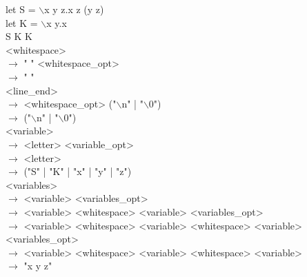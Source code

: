 \documentclass[12pt]{article}
\begin{document}
let S = $\backslash$x y z.x z (y z) \\
let K = $\backslash$x y.x \\
S K K \\

<whitespace> \\
$\rightarrow$ " " <whitespace\_opt> \\
$\rightarrow$ " " \\

<line\_end> \\
$\rightarrow$ <whitespace\_opt> ("$\backslash$n" | "$\backslash$0") \\
$\rightarrow$ ("$\backslash$n" | "$\backslash$0") \\

<variable> \\
$\rightarrow$ <letter> <variable\_opt> \\
$\rightarrow$ <letter> \\
$\rightarrow$ ("S" | "K" | "x" | "y" | "z") \\

<variables> \\
$\rightarrow$ <variable> <variables\_opt> \\
$\rightarrow$ <variable> <whitespace> <variable> <variables\_opt> \\
$\rightarrow$ <variable> <whitespace> <variable> <whitespace> <variable> <variables\_opt> \\
$\rightarrow$ <variable> <whitespace> <variable> <whitespace> <variable> \\
$\rightarrow$ "x y z" \\
\end{document}
